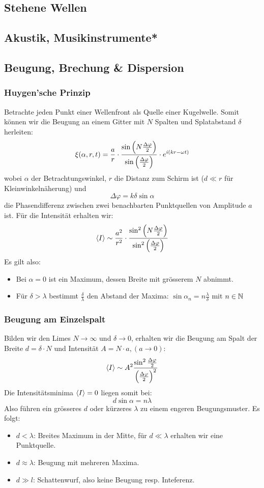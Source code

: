 \subsection{Stehene Wellen}
\subsection{Akustik, Musikinstrumente*}
\subsection{Beugung, Brechung \& Dispersion}

\subsubsection{Huygen'sche Prinzip}
Betrachte jeden Punkt einer Wellenfront als Quelle einer Kugelwelle. Somit können wir die Beugung an einem Gitter mit $N$ Spalten und Splatabstand $\delta$ herleiten:
$$\xi(\alpha, r, t) = \frac{a}{r}\cdot\frac{\sin\left(N \frac{\Delta \varphi}{2}\right)}{\sin\left(\frac{\Delta \varphi}{2}\right)} \cdot e^{i\left(kr-\omega t\right)}$$
wobei $\alpha$ der Betrachtungswinkel, $r$ die Distanz zum Schirm ist ($d \ll r$ für Kleinwinkelnäherung) und $$\Delta\varphi = k\delta \sin \alpha$$ die Phasendifferenz zwischen zwei benachbarten Punktquellen von Amplitude $a$ ist. Für die Intensität erhalten wir:
$$\left\langle I \right \rangle \sim \frac{a^2}{r^2} \cdot \frac{\sin^2\left(N \frac{\Delta \varphi}{2}\right)}{\sin^2\left(\frac{\Delta \varphi}{2}\right)}$$
Es gilt also:
\begin{itemize}
    \item Bei $\alpha = 0$ ist ein Maximum, dessen Breite mit grösserem $N$ abnimmt.
    \item Für $\delta > \lambda$ bestimmt $\frac{\delta}{\lambda}$ den Abstand der Maxima: $\sin \alpha_n = n \frac{\lambda}{\delta}$ mit $n \in \mathbb{N}$
\end{itemize}

\subsubsection{Beugung am Einzelspalt}
Bilden wir den Limes $N \to \infty$ und $\delta \to 0$, erhalten wir die Beugung am Spalt der Breite $d = \delta \cdot N$ und Intensität $A = N \cdot a, (a \to 0)$:
$$\left\langle I \right \rangle \sim A^2\frac{\sin^2 \frac{\Delta \varphi}{2}}{\left(\frac{\Delta \varphi}{2}\right)^2}$$
Die Intensitätsminima $\left\langle I \right \rangle = 0$ liegen somit bei:
$$ d \sin \alpha = n \lambda$$
Also führen ein grösseres $d$ oder kürzeres $\lambda$ zu einem engeren Beugungsmuster. Es folgt:
\begin{itemize}
    \item $d < \lambda$: Breites Maximum in der Mitte, für $d \ll \lambda$ erhalten wir eine Punktquelle.
    \item $d \approx \lambda$: Beugung mit mehreren Maxima.
    \item $d \gg l$: Schattenwurf, also keine Beugung resp. Inteferenz.
\end{itemize}

